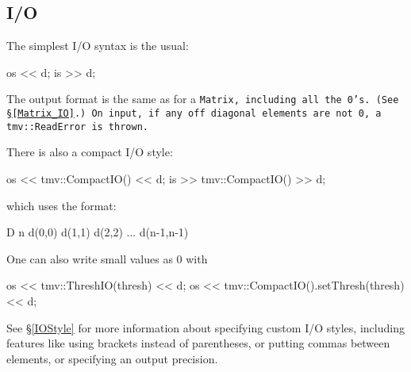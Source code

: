 \subsection{I/O}
\label{DiagMatrix_IO}

The simplest I/O syntax is the usual:
\begin{tmvcode}
os << d;
is >> d;
\end{tmvcode}
The output format is the same as for a \tt{Matrix}, including all the 0's.
(See \S\ref{Matrix_IO}.)  On input, if any off diagonal elements are not 0, a
\tt{tmv::ReadError} is thrown.

There is also a compact I/O style:
\begin{tmvcode}
os << tmv::CompactIO() << d;
is >> tmv::CompactIO() >> d;
\end{tmvcode}
which uses the format:
\begin{tmvcode}
D n d(0,0) d(1,1) d(2,2) ... d(n-1,n-1)
\end{tmvcode}

One can also write small values as 0 with
\begin{tmvcode}
os << tmv::ThreshIO(thresh) << d;
os << tmv::CompactIO().setThresh(thresh) << d;
\end{tmvcode}

See \S\ref{IOStyle} for more information about specifying custom I/O styles, including
features like using brackets instead of parentheses, or putting commas between elements,
or specifying an output precision.  
